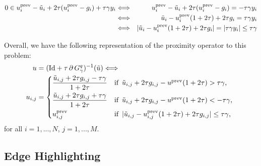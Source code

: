 \begin{enumerate}
\begin{eqnarray}
                    0 \in u^{\textnormal{prev}}_{i} - \tilde{u}_{i} + 2\tau (u^{\textnormal{prev}}_{i} - g_{i}) + \tau\gamma y_{i} &\Longleftrightarrow& u^{\textnormal{prev}}_{i} - \tilde{u}_{i} + 2\tau (u^{\textnormal{prev}}_{i} - g_{i}) = - \tau\gamma y_{i} \notag \\
                    &\Longleftrightarrow& \tilde{u}_{i} - u^{\textnormal{prev}}_{i} (1 + 2\tau) + 2\tau g_{i} = \tau\gamma y_{i} \notag \\
                    &\Longleftrightarrow& |\tilde{u}_{i} - u^{\textnormal{prev}}_{i} (1 + 2\tau) + 2\tau g_{i}| = |\tau\gamma y_{i}| \le \tau \gamma \notag
                \end{eqnarray}
        \end{enumerate}

        Overall, we have the following representation of the proximity operator to this problem:
            \begin{subequations}
                \begin{align}
                    u &= (\textnormal{Id} + \tau\,\partial\,G^{q}_{\gamma})^{-1}(\tilde{u}) \Longleftrightarrow \\
                    u_{i, j} &=
                        \begin{dcases*}
                            \frac{\tilde{u}_{i,j} + 2\tau g_{i,j} - \tau\gamma}{1 + 2\tau} & \textnormal{if\, $\tilde{u}_{i,j} + 2\tau g_{i,j} - u^{\textnormal{prev}} (1 + 2\tau) > \tau\gamma$,} \\
                            \frac{\tilde{u}_{i,j} + 2\tau g_{i,j} + \tau\gamma}{1 + 2\tau} & \textnormal{if\, $\tilde{u}_{i,j} + 2\tau g_{i,j} - u^{\textnormal{prev}} (1 + 2\tau) < -\tau\gamma$,} \\
                            u^{\textnormal{prev}}_{i,j} & \textnormal{if\, $|\tilde{u}_{i,j} - u^{\textnormal{prev}}_{i,j} (1 + 2\tau) + 2\tau g_{i,j}| \le \tau\gamma$},
                        \end{dcases*}
                \label{eq:prox_d_q_one}
                \end{align}
            \end{subequations}
        for all $i = 1, ..., N$, $j = 1, ..., M$.


    \subsection{Edge Highlighting} %
    \label{sub:edge_highlighting}
        
